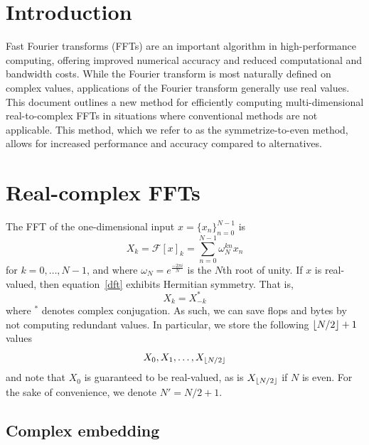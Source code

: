 \documentclass[12pt]{article}
\title{\thetitle}
\author{\theauthor}
\DeclarePairedDelimiter\floor{\lfloor}{\rfloor}
\begin{document}
\maketitle

\section{Introduction}

Fast Fourier transforms (FFTs) are an important algorithm in
high-performance computing, offering improved numerical accuracy and
reduced computational and bandwidth costs.  While the Fourier
transform is most naturally defined on complex values, applications of
the Fourier transform generally use real values.  This document
outlines a new method for efficiently computing multi-dimensional
real-to-complex FFTs in situations where conventional methods are not
applicable.  This method, which we refer to as the symmetrize-to-even
method, allows for increased performance and accuracy compared to
alternatives.

\section{Real-complex FFTs}

The FFT of the one-dimensional input $x=\{x_n\}_{n=0}^{N-1}$ is 
\begin{dmath}
  \label{dft}
  X_k = \mathcal{F}\left[x\right]_k = \sum_{n=0}^{N-1} \omega_N^{kn}x_n
\end{dmath}
for $k=0,\dots,{N-1}$, and where $\omega_N=e^{\frac{-2\pi{}i}{N}}$ is
the $N$th root of unity.  If $x$ is real-valued, then
equation~\eqref{dft} exhibits Hermitian symmetry.  That is,
\begin{dmath}
  X_k = X^*_{-k}
\end{dmath}
where ${}^*$ denotes complex conjugation.  As such, we can save flops
and bytes by not computing redundant values.  In particular, we
store the following $\floor{N/2}+1$ values
\begin{dmath}
  X_0, X_1, \dots, X_{\floor{N/2}}
\end{dmath}
and note that $X_0$ is guaranteed to be real-valued, as is
$X_{\floor{N/2}}$ if $N$ is even.  For the sake of convenience, we
denote $N'=N/2+1$.


\subsection{Complex embedding}
\label{sscomplexembed}
\end{document}
